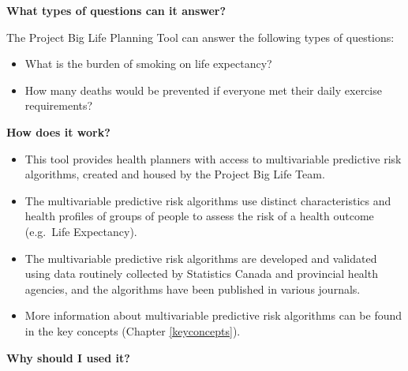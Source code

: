 \documentclass[]{book}
\providecommand{\tightlist}{%
  \setlength{\itemsep}{0pt}\setlength{\parskip}{0pt}}
\begin{document}
\textbf{What types of questions can it answer?}

The Project Big Life Planning Tool can answer the following types of
questions:

\begin{itemize}
\tightlist
\item
  What is the burden of smoking on life expectancy?
\item
  How many deaths would be prevented if everyone met their daily
  exercise requirements?
\end{itemize}

\textbf{How does it work?}

\begin{itemize}
\item
  This tool provides health planners with access to multivariable
  predictive risk algorithms, created and housed by the Project Big Life
  Team.
\item
  The multivariable predictive risk algorithms use distinct
  characteristics and health profiles of groups of people to assess the
  risk of a health outcome (e.g.~Life Expectancy).
\item
  The multivariable predictive risk algorithms are developed and
  validated using data routinely collected by Statistics Canada and
  provincial health agencies, and the algorithms have been published in
  various journals.
\item
  More information about multivariable predictive risk algorithms can be
  found in the key concepts (Chapter \ref{keyconcepts}).
\end{itemize}

\textbf{Why should I used it?}
\end{document}
